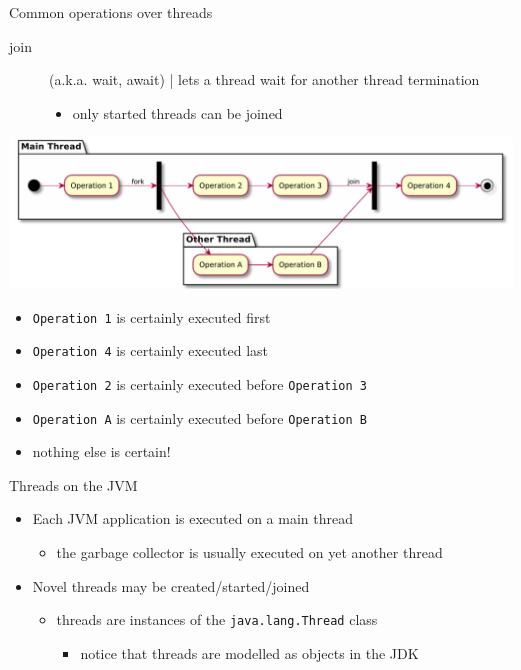 \documentclass{beamer}\mode<presentation>{\usetheme{AMSBolognaFC}}
\begin{document}
\begin{frame}[allowframebreaks]
\begin{exampleblock}{Common operations over threads}
\begin{description}
            \item[join] (a.k.a. wait, await) | lets a thread wait for another thread termination
            \begin{itemize}
                \item only started threads can be joined
            \end{itemize}
        \end{description}
    \end{exampleblock}

    \begin{center}
        \includegraphics[width=\linewidth]{img/fork-join.pdf}
    \end{center}
    \begin{itemize}
        \item \texttt{Operation 1} is certainly executed first
        \item \texttt{Operation 4} is certainly executed last
        \item \texttt{Operation 2} is certainly executed before \texttt{Operation 3}
        \item \texttt{Operation A} is certainly executed before \texttt{Operation B}
        \item nothing else is certain!
    \end{itemize}

    \framebreak

    \begin{block}{Threads on the JVM}
        \begin{itemize}
            \item Each JVM application is executed on a main thread
            \begin{itemize}
                \item the garbage collector is usually executed on yet another thread
            \end{itemize}

            \item Novel threads may be created/started/joined
            \begin{itemize}
                \item threads are instances of the \texttt{java.lang.\alert{Thread}} class
                \begin{itemize}
                    \item notice that threads are modelled as objects in the JDK
                \end{itemize}
            \end{itemize}


\end{itemize}
\end{block}
\end{frame}
\end{document}
